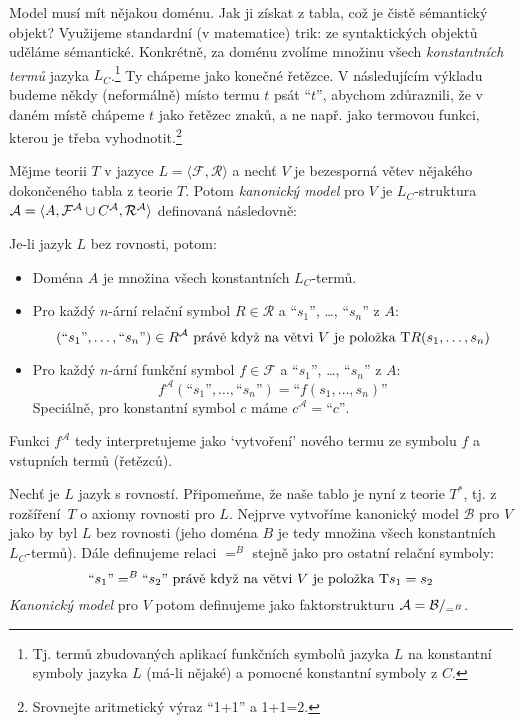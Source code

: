 Model musí mít nějakou doménu. Jak ji získat z tabla, což je čistě sémantický objekt? Využijeme standardní (v matematice) trik: ze syntaktických objektů uděláme sémantické. Konkrétně, za doménu zvolíme množinu všech \emph{konstantních termů} jazyka $L_C$.\footnote{Tj. termů zbudovaných aplikací funkčních symbolů jazyka $L$ na konstantní symboly jazyka $L$ (má-li nějaké) a pomocné konstantní symboly z $C$.} Ty chápeme jako konečné řetězce. V následujícím výkladu budeme někdy (neformálně) místo termu $t$ psát ``$t$'', abychom zdůraznili, že v daném místě chápeme $t$ jako řetězec znaků, a ne např. jako termovou funkci, kterou je třeba vyhodnotit.\footnote{Srovnejte aritmetický výraz ``1+1'' a 1+1=2.}

\begin{definition}\label{definition:canonical-model-predicate}
Mějme teorii $T$ v jazyce $L=\langle\mathcal F,\mathcal R\rangle$ a nechť $V$ je bezesporná větev nějakého dokončeného tabla z teorie $T$. Potom \emph{kanonický model} pro $V$ je $L_C$-struktura $\mathcal{A}=\langle A,\mathcal F^\mathcal A\cup C^\mathcal A,\mathcal R^\mathcal A\rangle$ definovaná následovně:

Je-li jazyk $L$ bez rovnosti, potom:
\begin{itemize}
    \item Doména $A$ je množina všech konstantních $L_C$-termů.
    \item Pro každý $n$-ární relační symbol $R\in\mathcal R$ a ``$s_1$'', \dots, ``$s_n$'' z $A$:
    $$
    (\text{``$s_1$''},\dots,\text{``$s_n$''})\in R^\mathcal A\text{ právě když na větvi $V$ je položka $\mathrm{T} R(s_1,\dots,s_n)$}
    $$
    \item Pro každý $n$-ární funkční symbol $f\in\mathcal F$ a ``$s_1$'', \dots, ``$s_n$'' z $A$:
    $$
    f^\mathcal A(\text{``$s_1$''},\dots,\text{``$s_n$''})=\text{``$f(s_1,\dots,s_n)$''}
    $$
    Speciálně, pro konstantní symbol $c$ máme $c^\mathcal A=\text{``$c$''}$.
\end{itemize}
Funkci $f^\mathcal A$ tedy interpretujeme jako `vytvoření' nového termu ze symbolu $f$ a vstupních termů (řetězců). 

Nechť je $L$ jazyk s rovností. Připomeňme, že naše tablo je nyní z teorie $T^*$, tj. z rozšíření~$T$ o axiomy rovnosti pro $L$. Nejprve vytvoříme kanonický model $\mathcal B$ pro $V$ jako by byl $L$ bez rovnosti (jeho doména $B$ je tedy množina všech konstantních $L_C$-termů). Dále definujeme relaci $=^B$ stejně jako pro ostatní relační symboly:
$$
\text{``$s_1$''}=^B\text{``$s_2$''}\text{ právě když na větvi $V$ je položka $\mathrm{T} s_1=s_2$}
$$
\emph{Kanonický model} pro $V$ potom definujeme jako faktorstrukturu $\mathcal{A}=\mathcal{B}/_{=^B}$.
\end{definition}

